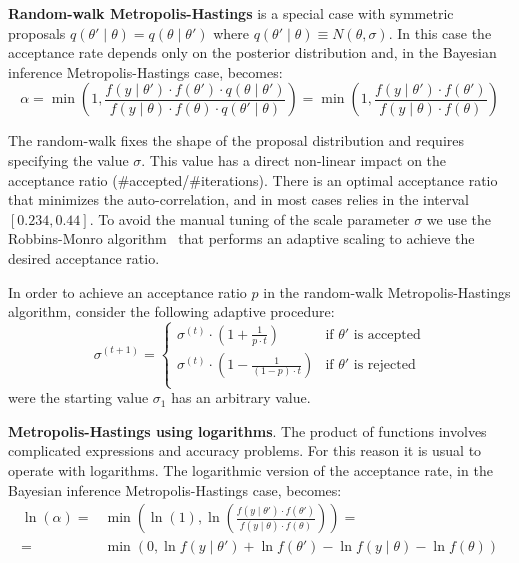 \documentclass[11pt,fleqn]{book} %
\begin{document}
\textbf{Random-walk Metropolis-Hastings} is a special case with symmetric proposals
$q(\theta' \mid \theta) = q(\theta \mid \theta')$ where $q(\theta' \mid \theta) \equiv N(\theta,\sigma)$. 
In this case the acceptance rate depends only on the posterior distribution
and, in the Bayesian inference Metropolis-Hastings case, becomes:
\begin{displaymath}
	\alpha = 
	\min\left(1,\frac{f(y \mid \theta') \cdot f(\theta') \cdot q(\theta \mid \theta')}{f(y \mid \theta)  \cdot f(\theta) \cdot q(\theta' \mid \theta)}\right) = 
	\min\left(1,\frac{f(y \mid \theta') \cdot f(\theta')}{f(y \mid \theta) \cdot f(\theta)}\right)
\end{displaymath}

The random-walk fixes the shape of the proposal distribution and requires 
specifying the value $\sigma$. This value has a direct non-linear impact 
on the acceptance ratio (\#accepted/\#iterations). There is an optimal 
acceptance ratio that minimizes the auto-correlation, and in most cases 
relies in the interval $[0.234,0.44]$. To avoid the  manual tuning of the 
scale parameter $\sigma$ we use the Robbins-Monro algorithm~\cite{garthwaite:2010} 
that performs an adaptive scaling to achieve the desired acceptance ratio.

\begin{proposition}
	In order to achieve an acceptance ratio $p$ in the random-walk 
	Metropolis-Hastings algorithm, consider the following adaptive
	procedure:
	\begin{displaymath}
		\sigma^{(t+1)} = \left\{
		\begin{array}{ll}
			\sigma^{(t)} \cdot \left( 1 + \frac{1}{p \cdot t} \right) & \text{if $\theta'$ is accepted} \\
			\sigma^{(t)} \cdot \left( 1 - \frac{1}{(1-p) \cdot t} \right) & \text{if $\theta'$ is rejected} \\
		\end{array}
		\right.
	\end{displaymath}
	were the starting value $\sigma_1$ has an arbitrary value.
\end{proposition}

\textbf{Metropolis-Hastings using logarithms}.
The product of functions involves complicated expressions and accuracy 
problems. For this reason it is usual to operate with logarithms. The 
logarithmic version of the acceptance rate, in the Bayesian inference 
Metropolis-Hastings case, becomes:
\begin{displaymath}
	\begin{array}{rl}
		\ln(\alpha) = & \min \left( \ln(1),  
		\ln \left(\frac{f(y \mid \theta') \cdot f(\theta')}{f(y \mid \theta) \cdot f(\theta)}\right)
		\right) = \\
		= & \min \left( 0,
		\ln f(y \mid \theta') + \ln f(\theta') - \ln f(y \mid \theta) - \ln f(\theta)
		\right)
	\end{array}
\end{displaymath}
\end{document}
